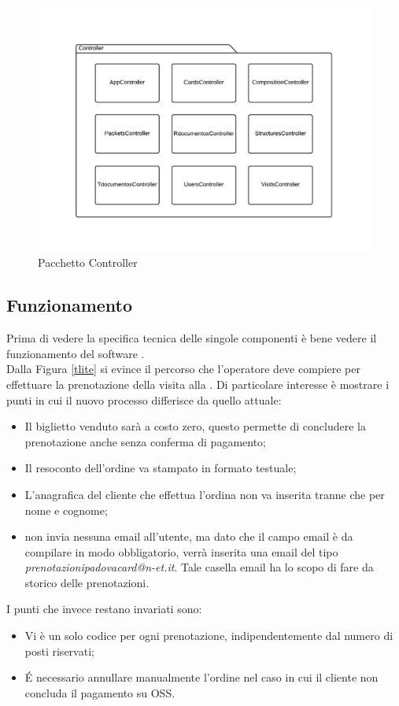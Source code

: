\begin{figure}[H]
\centering
\includegraphics[width=1\textwidth]{images/controller.png}
\caption{Pacchetto Controller}
\end{figure}

\subsection{Funzionamento \tlite}\label{progettazionetlite}
Prima di vedere la specifica tecnica delle singole componenti è bene vedere il funzionamento del software \glossario{\tlite}. \\

Dalla Figura \ref{tlite} si evince il percorso che l'operatore deve compiere per effettuare la prenotazione della visita alla \cappella. Di particolare interesse è mostrare i punti in cui il nuovo processo differisce da quello attuale:
\begin{itemize}
\item Il biglietto venduto sarà a costo zero, questo permette di concludere la prenotazione anche senza conferma di pagamento;
\item Il resoconto dell'ordine va stampato in formato testuale;
\item L'anagrafica del cliente che effettua l'ordina non va inserita tranne che per nome e cognome;
\item \tlite non invia nessuna email all'utente, ma dato che il campo email è da compilare in modo obbligatorio, verrà inserita una email del tipo \textit{prenotazionipadovacard@n-et.it}. Tale casella email ha lo scopo di fare da storico delle prenotazioni.
\end{itemize}
I punti che invece restano invariati sono:
\begin{itemize}
\item Vi è un solo codice \tlite per ogni prenotazione, indipendentemente dal numero di posti riservati;
\item \'E necessario annullare manualmente l'ordine nel caso in cui il cliente non concluda il pagamento su OSS.
\end{itemize}

